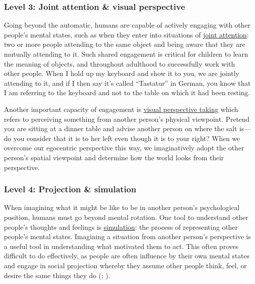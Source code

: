 \documentclass[
]{krantz}
\begin{document}
\subsubsection*{Level 3: Joint attention \& visual perspective}\label{level-3-joint-attention-visual-perspective}


Going beyond the automatic, humans are capable of actively engaging with other people's mental states, such as when they enter into situations of \hyperref[joint-attention]{joint attention}: two or more people attending to the same object and being aware that they are mutually attending to it. Such shared engagement is critical for children to learn the meaning of objects, and throughout adulthood to successfully work with other people. When I hold up my keyboard and show it to you, we are jointly attending to it, and if I then say it's called ``Tastatur'' in German, you know that I am referring to the keyboard and not to the table on which it had been resting.

Another important capacity of engagement is \hyperref[visual-perspective-taking]{visual perspective taking} which refers to perceiving something from another person's physical viewpoint. Pretend you are sitting at a dinner table and advise another person on where the salt is---do you consider that it is to her left even though it is to your right? When we overcome our egocentric perspective this way, we imaginatively adopt the other person's spatial viewpoint and determine how the world looks from their perspective.

\subsubsection*{Level 4: Projection \& simulation}\label{level-4-projection-simulation}


When imagining what it might be like to be in another person's psychological position, humans must go beyond mental rotation. One tool to understand other people's thoughts and feelings is \hyperref[simulation]{simulation}: the process of representing other people's mental states. Imagining a situation from another person's perspective is a useful tool in understanding what motivated them to act. This often proves difficult to do effectively, as people are often influence by their own mental states and engage in social projection whereby they assume other people think, feel, or desire the same things they do (; ).
\end{document}
